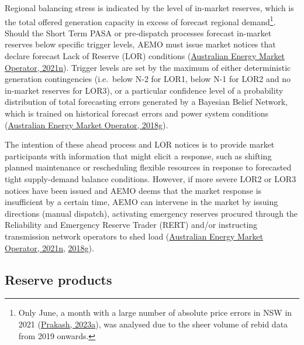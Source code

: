 \documentclass[12pt,a4paper,]{report}
\begin{document}
Regional balancing stress is indicated by the level of in-market
reserves, which is the total offered generation capacity in excess of
forecast regional demand\footnote{Only June, a month with a large number
  of absolute price errors in NSW in 2021
  (\protect\hyperlink{ref-prakashEnergyPriceConvergence2023}{Prakash,
  2023a}), was analysed due to the sheer volume of rebid data from 2019
  onwards.}. Should the Short Term PASA or pre-dispatch processes
forecast in-market reserves below specific trigger levels, AEMO must
issue market notices that declare forecast Lack of Reserve (LOR)
conditions
(\protect\hyperlink{ref-australianenergymarketoperatorShortTermReserve2021}{Australian
Energy Market Operator, 2021n}). Trigger levels are set by the maximum
of either deterministic generation contingencies (i.e.~below N-2 for
LOR1, below N-1 for LOR2 and no in-market reserves for LOR3), or a
particular confidence level of a probability distribution of total
forecasting errors generated by a Bayesian Belief Network, which is
trained on historical forecast errors and power system conditions
(\protect\hyperlink{ref-australianenergymarketoperatorReserveLevelDeclaration2018}{Australian
Energy Market Operator, 2018g}).

The intention of these ahead process and LOR notices is to provide
market participants with information that might elicit a response, such
as shifting planned maintenance or rescheduling flexible resources in
response to forecasted tight supply-demand balance conditions. However,
if more severe LOR2 or LOR3 notices have been issued and AEMO deems that
the market response is insufficient by a certain time, AEMO can
intervene in the market by issuing directions (manual dispatch),
activating emergency reserves procured through the Reliability and
Emergency Reserve Trader (RERT) and/or instructing transmission network
operators to shed load
(\protect\hyperlink{ref-australianenergymarketoperatorShortTermReserve2021}{Australian
Energy Market Operator, 2021n},
\protect\hyperlink{ref-australianenergymarketoperatorReserveLevelDeclaration2018}{2018g}).

\hypertarget{sec:reserves-nemreserves}{%
\subsection{Reserve products}\label{sec:reserves-nemreserves}}
\end{document}

